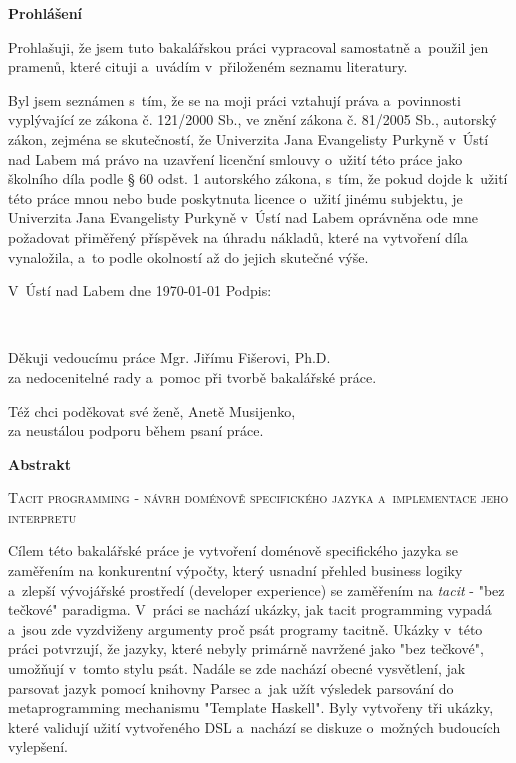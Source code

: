 \documentclass[male, czech]{kithesis}
\newcommand{\TITULcz}{Tacit programming - návrh doménově specifického jazyka a~implementace jeho interpretu} %
\begin{document}
\cleardoublepage
\thispagestyle{empty}

\textbf{Prohlášení}

Prohlašuji, že jsem tuto bakalářskou práci vypracoval samostatně a~použil
jen pramenů, které cituji a~uvádím v~přiloženém seznamu literatury.

\vspace{1em}
Byl jsem seznámen s~tím, že se na moji práci vztahují práva a~povinnosti vyplývající ze zákona č. 121/2000 Sb., ve znění zákona č. 81/2005 Sb., autorský zákon, zejména se skutečností, že Univerzita Jana Evangelisty Purkyně v~Ústí nad Labem má právo na uzavření licenční smlouvy o~užití této práce jako školního díla podle § 60 odst. 1 autorského zákona, s~tím, že pokud dojde k~užití této práce mnou nebo bude poskytnuta licence o~užití jinému
subjektu, je Univerzita Jana Evangelisty Purkyně v~Ústí nad Labem oprávněna ode mne požadovat přiměřený příspěvek na úhradu nákladů, které na vytvoření díla vynaložila, a~to podle okolností až do jejich skutečné výše.

\vspace{1em}
V~Ústí nad Labem dne \today \hspace{0.3\textwidth} Podpis:


\clearpage
\thispagestyle{empty}
~\vfill

\begin{flushright}
  Děkuji vedoucímu práce Mgr. Jiřímu Fišerovi, Ph.D.\\ za nedocenitelné rady a~pomoc při tvorbě bakalářské práce.

  Též chci poděkovat své ženě, Anetě Musijenko, \\ za neustálou podporu během psaní práce.
\end{flushright}

\cleardoublepage
\thispagestyle{empty}

\textbf{\textsf{Abstrakt}}

\textsc{\TITULcz}

Cílem této bakalářské práce je vytvoření doménově specifického jazyka se zaměřením na konkurentní výpočty, 
který usnadní přehled business logiky a~zlepší vývojářské prostředí (developer experience) se zaměřením na \textit{tacit} - "bez tečkové" paradigma.
V~práci se nachází ukázky, 
jak tacit programming vypadá
a~jsou zde vyzdviženy argumenty proč psát programy tacitně.
Ukázky v~této práci potvrzují, 
že jazyky, 
které nebyly primárně navržené jako "bez tečkové", 
umožňují v~tomto stylu psát.
Nadále se zde nachází obecné vysvětlení, 
jak parsovat jazyk pomocí knihovny Parsec
a~jak užít výsledek parsování do metaprogramming mechanismu "Template Haskell".
Byly vytvořeny tři ukázky, 
které validují užití vytvořeného DSL
a~nachází se diskuze o~možných budoucích vylepšení.
\end{document}
